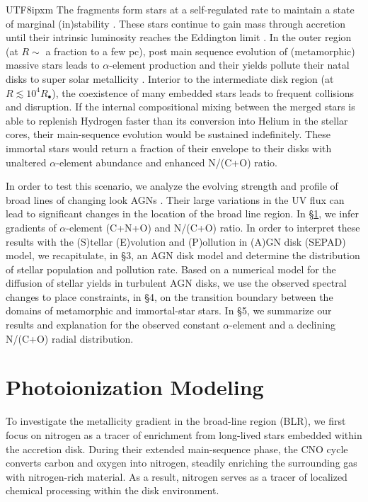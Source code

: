 \documentclass[linenumbers,trackchanges]{aastex701}
\begin{document}
\begin{CJK*}{UTF8}{ipxm}
The fragments form stars at a self-regulated rate 
to maintain a state of marginal (in)stability \citep{chenlin2024}.
These stars continue to gain mass through accretion
until their intrinsic luminosity reaches the 
Eddington limit \citep{cantiello2021, chenetal2024}.  
In the outer region (at $R \sim$ a fraction
to a few pc), post main sequence evolution of 
(metamorphic) massive stars leads to $\alpha$-element 
production and their yields pollute their natal disks 
to super solar metallicity \citep{alidib2023, xuetal2025}. 
Interior to the intermediate disk region (at $R \lesssim 10^4 
R_\bullet$), the coexistence of many embedded stars leads to
frequent collisions and disruption. If the internal compositional 
mixing between the merged stars is able to replenish Hydrogen 
faster than its conversion into Helium in the stellar cores,
their main-sequence evolution would be sustained indefinitely.
These immortal stars would return a fraction of their envelope
to their disks with unaltered $\alpha$-element 
abundance and enhanced N/(C+O) ratio.

In order to test this scenario, we analyze the 
evolving strength and profile of broad lines 
of changing look AGNs \citep{stern2018, sheng2020}.
Their large variations in the UV flux can lead to
significant changes in the location of the broad line
region.  In \S\ref{sec:photoionization}, we infer
gradients of $\alpha$-element (C+N+O) and N/(C+O)
ratio.  In order to interpret these results with
the (S)tellar (E)volution and (P)ollution in 
(A)GN disk (SEPAD) model, we recapitulate, in \S3, an 
AGN disk model and determine the distribution of 
stellar population and pollution rate.  Based on 
a numerical model for the diffusion of stellar yields
in turbulent AGN disks, we use the observed
spectral changes to place constraints, in \S4, 
on the transition boundary between the domains 
of  metamorphic and immortal-star stars.  In \S5,
we summarize our results and explanation for the 
observed constant $\alpha$-element and a declining 
N/(C+O) radial distribution.  

\section{Photoionization Modeling}
\label{sec:photoionization}
To investigate the metallicity gradient in the broad-line region (BLR), we first focus on nitrogen as a tracer of enrichment from long-lived stars embedded within the accretion disk. During their extended main-sequence phase, the CNO cycle converts carbon and oxygen into nitrogen, steadily enriching the surrounding gas with nitrogen-rich material. As a result, nitrogen serves as a tracer of localized chemical processing within the disk environment.


\end{CJK*}
\end{document}
